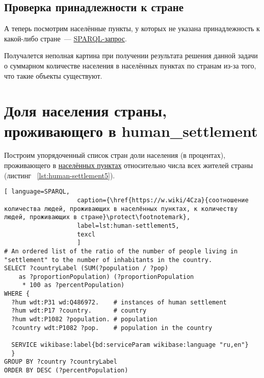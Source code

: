 \subsection{Проверка принадлежности к стране}

А теперь посмотрим населённые пункты, у которых не указана принадлежность к какой-либо стране~--- \href{https://w.wiki/4FV8}{SPARQL-запрос}\footnotemark.

Получалется неполная картина при получении результата решения данной задачи о суммарном количестве населения в населённых пунктах по странам из-за того, что такие объекты существуют.

\section{Доля населения страны, проживающего в human\_settlement}

Построим упорядоченный список стран доли населения (в процентах), проживающего в \href{http://www.wikidata.org/entity/Q486972}{населённых пунктах} относительно числа всех жителей страны (листинг ~\protect\ref{lst:human-settlement5}).

\begin{lstlisting}[ language=SPARQL, 
                    caption={\href{https://w.wiki/4Cza}{соотношение количества людей, проживающих в населённых пунктах, к количеству людей, проживающих в стране}\protect\footnotemark},
                    label=lst:human-settlement5,
                    texcl 
                    ]
# An ordered list of the ratio of the number of people living in 
"settlement" to the number of inhabitants in the country.
SELECT ?countryLabel (SUM(?population / ?pop) 
	as ?proportionPopulation) (?proportionPopulation
	 * 100 as ?percentPopulation)
WHERE {
  ?hum wdt:P31 wd:Q486972.    # instances of human settlement  
  ?hum wdt:P17 ?country.      # country 
  ?hum wdt:P1082 ?population. # population
  ?country wdt:P1082 ?pop.    # population in the country

  SERVICE wikibase:label{bd:serviceParam wikibase:language "ru,en"}
  }
GROUP BY ?country ?countryLabel
ORDER BY DESC (?percentPopulation)
\end{lstlisting}%

